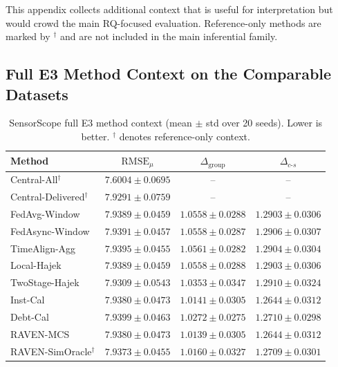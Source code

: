 \documentclass[letterpaper,journal]{IEEEtran}
\begin{document}
This appendix collects additional context that is useful for interpretation but
would crowd the main RQ-focused evaluation.  Reference-only methods are marked
by $^\dagger$ and are not included in the main inferential family.

\subsection{Full E3 Method Context on the Comparable Datasets}
\label{app:e3_full_context}

\begin{table}[t]
\centering
\caption{SensorScope full E3 method context (mean $\pm$ std over 20 seeds).
Lower is better.  $^\dagger$ denotes reference-only context.}
\label{tab:app_e3_sensorscope}
\scriptsize
\setlength{\tabcolsep}{4.3pt}
\begin{tabular*}{\textwidth}{@{\extracolsep{\fill}}lccc}
\toprule
Method & $\mathrm{RMSE}_{\mu}$ & $\Delta_{\mathrm{group}}$ & $\Delta_{c\text{-}s}$\\
\midrule
Central-All$^{\dagger}$ & $7.6004\pm0.0695$ & -- & -- \\
Central-Delivered$^{\dagger}$ & $7.9291\pm0.0759$ & -- & -- \\
FedAvg-Window & $7.9389\pm0.0459$ & $1.0558\pm0.0288$ & $1.2903\pm0.0306$ \\
FedAsync-Window & $7.9391\pm0.0457$ & $1.0558\pm0.0287$ & $1.2906\pm0.0307$ \\
TimeAlign-Agg & $7.9395\pm0.0455$ & $1.0561\pm0.0282$ & $1.2904\pm0.0304$ \\
Local-Hajek & $7.9389\pm0.0459$ & $1.0558\pm0.0288$ & $1.2903\pm0.0306$ \\
TwoStage-Hajek & $7.9309\pm0.0543$ & $1.0353\pm0.0347$ & $1.2910\pm0.0324$ \\
Inst-Cal & $7.9380\pm0.0473$ & $1.0141\pm0.0305$ & $1.2644\pm0.0312$ \\
Debt-Cal & $7.9399\pm0.0463$ & $1.0272\pm0.0275$ & $1.2710\pm0.0298$ \\
RAVEN-MCS & $7.9380\pm0.0473$ & $1.0139\pm0.0305$ & $1.2644\pm0.0312$ \\
RAVEN-SimOracle$^{\dagger}$ & $7.9373\pm0.0455$ & $1.0160\pm0.0327$ & $1.2709\pm0.0301$ \\
\bottomrule
\end{tabular*}
\end{table}
\end{document}
